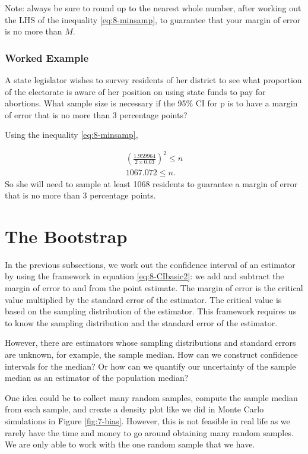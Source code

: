 \documentclass[
]{book}
\begin{document}
Note: always be sure to round up to the nearest whole number, after working out the LHS of the inequality \eqref{eq:8-minsamp}, to guarantee that your margin of error is no more than \(M\).

\hypertarget{worked-example-4}{%
\subsubsection{Worked Example}\label{worked-example-4}}

A state legislator wishes to survey residents of her district to see what proportion of the electorate is aware of her position on using state funds to pay for abortions. What sample size is necessary if the 95\% CI for p is to have a margin of error that is no more than 3 percentage points?

Using the inequality \eqref{eq:8-minsamp},

\[
\begin{split}
\left(\frac{1.959964}{2 \times 0.03}\right)^2 \leq n \\
1067.072 \leq n.
\end{split}
\]
So she will need to sample at least 1068 residents to guarantee a margin of error that is no more than 3 percentage points.

\hypertarget{bootstrap}{%
\section{The Bootstrap}\label{bootstrap}}

In the previous subsections, we work out the confidence interval of an estimator by using the framework in equation \eqref{eq:8-CIbasic2}: we add and subtract the margin of error to and from the point estimate. The margin of error is the critical value multiplied by the standard error of the estimator. The critical value is based on the sampling distribution of the estimator. This framework requires us to know the sampling distribution and the standard error of the estimator.

However, there are estimators whose sampling distributions and standard errors are unknown, for example, the sample median. How can we construct confidence intervals for the median? Or how can we quantify our uncertainty of the sample median as an estimator of the population median?

One idea could be to collect many random samples, compute the sample median from each sample, and create a density plot like we did in Monte Carlo simulations in Figure \ref{fig:7-bias}. However, this is not feasible in real life as we rarely have the time and money to go around obtaining many random samples. We are only able to work with the one random sample that we have.
\end{document}
